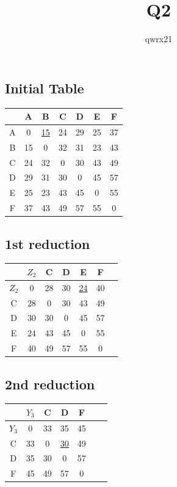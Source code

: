 \documentclass{article}
\title{Q2}
\author{qwrx21}
\begin{document}
\maketitle
\pagebreak

\subsection*{Initial Table}

\begin{center}
\begin{tabular}{c|c c c c c c}
    
    &A&B&C&D&E&F \\
    \hline
    A&0&\underline{15}&24&29&25&37 \\
    B&15&0&32&31&23&43 \\
    C&24&32&0&30&43&49 \\
    D&29&31&30&0&45&57 \\
    E&25&23&43&45&0&55 \\
    F&37&43&49&57&55&0 \\
    
\end{tabular}
\end{center}


\subsection*{1st reduction}

\begin{center}
\begin{tabular}{c|c c c c c c}
    
    & $Z_2$ &C&D&E&F \\
    \hline
    $Z_2$&0&28&30&\underline{24}&40 \\
    C&28&0&30&43&49 \\
    D&30&30&0&45&57 \\
    E&24&43&45&0&55 \\
    F&40&49&57&55&0 \\
   
    
\end{tabular}
\end{center}

\subsection*{2nd reduction}

\begin{center}
\begin{tabular}{c|c c c c c c}
    
    & $Y_3$ &C&D&F \\
    \hline
    $Y_3$&0&33&35&45 \\
    C&33&0&\underline{30}&49 \\
    D&35&30&0&57 \\
    F&45&49&57&0 \\
   
    
\end{tabular}
\end{center}
\end{document}
